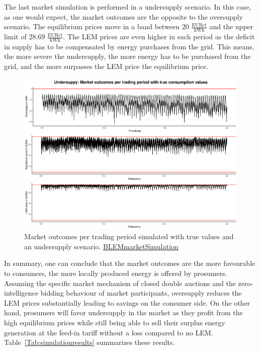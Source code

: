 The last market simulation is performed in a undersupply scenario. In this case, as one would expect, the market outcomes are the opposite to the oversupply scenario. The equilibrium prices move in a band between 20 $\frac{\text{EURct}}{\text{kWh}}$ and the upper limit of 28.69 $\frac{\text{EURct}}{\text{kWh}}$. The LEM prices are even higher in each period as the deficit in supply has to be compensated by energy purchases from the grid. This means, the more severe the undersupply, the more energy has to be purchased from the grid, and the more surpasses the LEM price the equilibrium price.
%
\begin{figure}[htbp]
    \centering
    \includegraphics[width=\textwidth]{thesis/graphs/marketsimulation/marketoutcome_true_undersupply.pdf}
    \caption[Market outcomes simulated with undersupply and true values]{Market outcomes per trading period simulated with true values and an undersupply scenario. \quantnet\href{}{BLEMmarketSimulation}}
    \label{Fig:marketoutcomes_true_under}
\end{figure}
%

In summary, one can conclude that the market outcomes are the more favourable to consumers, the more locally produced energy is offered by prosumers. Assuming the specific market mechanism of closed double auctions and the zero-intelligence bidding behaviour of market participants, oversupply reduces the LEM prices substantially leading to savings on the consumer side. On the other hand, prosumers will favor undersupply in the market as they profit from the high equilibrium prices while still being able to sell their surplus energy generation at the feed-in tariff without a loss compared to no LEM. Table~\ref{Tab:simulationresults} summarizes these results.


